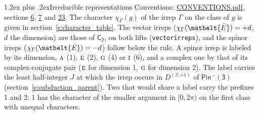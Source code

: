 \documentclass[10pt,a4paper]{article}
\makeatletter
\renewcommand\section{\@startsection{section}{1}{\z@}{-3ex plus -1ex minus -.2ex}%
  {1.2ex plus .2ex}{\normalfont\large\sffamily\bfseries\color{parttitle}}}
\numberwithin{equation}{section}
\newcommand{\eltfont}[1]{{\let\sigma\eltsigma\mathelt{#1}}}
\newcommand{\grp}[1]{\mathsf{#1}}
\newcommand{\irr}[1]{\text{\normalfont\scshape #1}}
\newcommand{\elt}[1]{\eltfont{#1}}
\newcommand{\irrJp}[2]{D^{(#1,#2)}}
\newcommand{\irchar}[1]{\chi_{#1}}
\newcommand{\barred}[1]{\bar{#1}}
\makeatother
\begin{document}
\section{Irreducible representations}\label{s:irreps}
Conventions: \href{../../CONVENTIONS.pdf}{CONVENTIONS.pdf}, sections \href{../../../rotation/CONVENTIONS.pdf\#conv.6}{6}, \href{../../../rotation/CONVENTIONS.pdf\#conv.7}{7} and \href{../../CONVENTIONS.pdf\#conv.23}{23}.
\leavevmode\label{n:function.character}\label{n:irrep.Gamma}The character $\irchar{\Gamma}(g)$ of the irrep $\Gamma$ on the class of $g$ is given in section~\ref{s:character_table}. \label{n:index.dimension}The vector irreps ($\irchar{\Gamma}(\elt{\barred{E}}) = +d$, $d$ the dimension) are those of \href{../../../rotation/data/pdf/C2.pdf}{$\grp{C_{2}}$}, on both lifts (\texttt{vectorirreps}), and the spinor irreps ($\irchar{\Gamma}(\elt{\barred{E}}) = -d$) follow below the rule. A spinor irrep is labeled by its dimension, $\irr{a}$ (1), $\irr{e}$ (2), $\irr{g}$ (4) or $\irr{i}$ (6), and a complex one by that of its complex-conjugate pair ($\irr{e}$ for dimension 1, $\irr{g}$ for dimension 2). The label carries the least half-integer $J$ at which the irrep occurs in $\irrJp{J}{+1}$ of $\grp{Pin^{-}(3)}$ (section~\ref{s:subduction_parent}). Two that would share a label carry the prefixes 1 and 2: 1 has the character of the smaller argument in $[0, 2\pi)$ on the first class with unequal characters.
\end{document}
